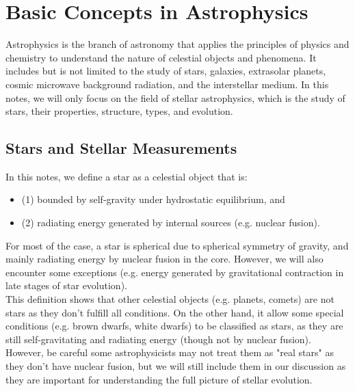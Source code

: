 \chapter{Basic Concepts in Astrophysics}
Astrophysics is the branch of astronomy that applies the principles of physics and chemistry to understand the nature of celestial objects and phenomena. It includes but is not limited to the study of stars, galaxies, extrasolar planets, cosmic microwave background radiation, and the interstellar medium. In this notes, we will only focus on the field of stellar astrophysics, which is the study of stars, their properties, structure, types, and evolution.
\bigskip\noindent 
\section{Stars and Stellar Measurements}
\begin{intuition}
    In this notes, we define a star as a celestial object that is:
    \begin{itemize}
        \item (1) bounded by self-gravity under hydrostatic equilibrium, and
        \item (2) radiating energy generated by internal sources (e.g. nuclear fusion). 
    \end{itemize}
    For most of the case, a star is spherical due to spherical symmetry of gravity, and mainly radiating energy by nuclear fusion in the core. However, we will also encounter some exceptions (e.g. energy generated by gravitational contraction in late stages of star evolution). \\

    This definition shows that other celestial objects (e.g. planets, comets) are not stars as they don't fulfill all conditions. On the other hand, it allow some special conditions (e.g. brown dwarfs, white dwarfs) to be classified as stars, as they are still self-gravitating and radiating energy (though not by nuclear fusion). However, be careful some astrophysicists may not treat them as "real stars" as they don't have nuclear fusion, but we will still include them in our discussion as they are important for understanding the full picture of stellar evolution.
\end{intuition}

